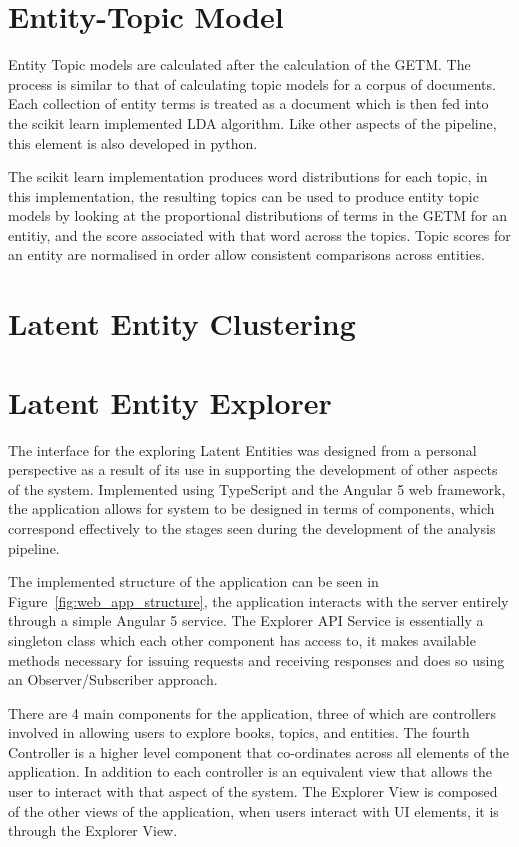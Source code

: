 \documentclass[10pt]{report}
\begin{document}
\section{Entity-Topic Model}
Entity Topic models are calculated after the calculation of the GETM. The process is similar to that of calculating topic models for a corpus of documents. Each collection of entity terms is treated as a document which is then fed into the scikit learn implemented LDA algorithm. Like other aspects of the pipeline, this element is also developed in python.

The scikit learn implementation produces word distributions for each topic, in this implementation, the resulting topics can be used to produce entity topic models by looking at the proportional distributions of terms in the GETM for an entitiy, and the score associated with that word across the topics. Topic scores for an entity are normalised in order allow consistent comparisons across entities.
\section{Latent Entity Clustering }

\section{Latent Entity Explorer}
The interface for the exploring Latent Entities was designed from a personal perspective as a result of its use in supporting the development of other aspects of the system. Implemented using TypeScript and the Angular 5 web framework, the application allows for system to be designed in terms of components, which correspond effectively to the stages seen during the development of the analysis pipeline.

The implemented structure of the application can be seen in Figure~\ref{fig:web_app_structure}, the application interacts with the server entirely through a simple Angular 5 service. The Explorer API Service is essentially a singleton class which each other component has access to, it makes available methods necessary for issuing requests and receiving responses and does so using an Observer/Subscriber approach. 

There are 4 main components for the application, three of which are controllers involved in allowing users to explore books, topics, and entities. The fourth Controller is a higher level component that co-ordinates across all elements of the application. In addition to each controller is an equivalent view that allows the user to interact with that aspect of the system. The Explorer View is composed of the other views of the application, when users interact with UI elements, it is through the Explorer View.
\end{document}
